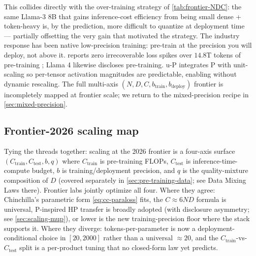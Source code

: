 This collides directly with the over-training strategy of
\cref{tab:frontier-NDC}: the same Llama-3 8B that gains inference-cost
efficiency from being small dense + token-heavy is, by the
\citet{scaling-laws-precision-2024} prediction, more difficult to
quantize at deployment time --- partially offsetting the very gain
that motivated the strategy. The industry response has been native
low-precision training: pre-train at the precision you will deploy,
not above it.  reports zero irrecoverable loss spikes over
$14.8\text{T}$ tokens of  pre-training
\citep[abstract]{deepseek-v3}; Llama 4 likewise discloses 
pre-training. u-\textmu P \citep{u-mup2024} integrates \textmu P with
unit-scaling so per-tensor activation magnitudes are predictable,
enabling  without dynamic rescaling. The full multi-axis
$(N, D, C, b_{\text{train}}, b_{\text{deploy}})$ frontier is
incompletely mapped at frontier scale; we return to the
mixed-precision recipe in \cref{sec:mixed-precision}.

\subsection{Frontier-2026 scaling map}
\label{sec:scaling-map}

Tying the threads together: scaling at the 2026 frontier is a
four-axis surface $(C_{\text{train}}, C_{\text{test}}, b, q)$ where
$C_{\text{train}}$ is pre-training FLOPs, $C_{\text{test}}$ is
inference-time-compute budget, $b$ is training/deployment precision,
and $q$ is the quality-mixture composition of $D$ (covered separately
in \cref{sec:pre-training-data}; see Data Mixing Laws there). Frontier
labs jointly optimize all four. Where they agree: Chinchilla's
parametric form \cref{eq:cc-paraloss} fits, the $C \approx 6 N D$
formula is universal, \textmu P-inspired HP transfer is broadly
adopted (with disclosure asymmetry; see \cref{sec:scaling-mup}), 
or lower is the new training-precision floor where the stack supports
it. Where they diverge: tokens-per-parameter is now a
deployment-conditional choice in $[20, 2000]$ rather than a
universal $\approx 20$, and the $C_{\text{train}}$-vs-$C_{\text{test}}$
split is a per-product tuning that no closed-form law yet predicts.

